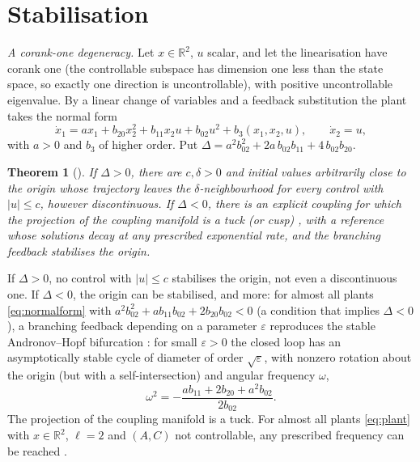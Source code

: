 \documentclass[11pt,reqno]{amsart}
\theoremstyle{plain}
\newtheorem*{theorem}{Theorem}
\theoremstyle{remark}
\theoremstyle{definition}
\newcommand{\R}{\mathbb{R}}
\begin{document}
\section{Stabilisation}\label{sec:stab}

\emph{A corank-one degeneracy.} Let $x\in\R^{2}$, $u$ scalar, and let the linearisation have corank one (the controllable subspace has dimension one less than the state space, so exactly one direction is uncontrollable), with positive uncontrollable eigenvalue. By a
linear change of variables and a feedback substitution the plant takes the normal form \cite[\S4.2]{Shosh1990}
\begin{equation}\label{eq:normalform}
  \dot x_1 = a x_1 + b_{20}x_2^{2} + b_{11}x_2u + b_{02}u^{2} + b_3(x_1,x_2,u),\qquad \dot x_2 = u,
\end{equation}
with $a>0$ and $b_3$ of higher order. Put $\Delta=a^{2}b_{02}^{2}+2a\,b_{02}b_{11}+4\,b_{02}b_{20}$.

\begin{theorem}[{\cite[Thm.~4.2, Prop.~4.4]{Shosh1990}}]
If $\Delta>0$, there are $c,\delta>0$ and initial values arbitrarily close to the origin whose trajectory leaves the
$\delta$-neighbourhood for every control with $|u|\le c$, however discontinuous. If $\Delta<0$, there is an
explicit coupling for which the projection of the coupling manifold is a tuck (or cusp) \cite{AGV,MondNuno2020}, with a reference whose solutions decay at any prescribed exponential rate, and the branching feedback stabilises the origin.
\end{theorem}

If $\Delta>0$, no control with $|u|\le c$ stabilises the origin, not even a discontinuous one. If $\Delta<0$, the origin can be
stabilised, and more: for almost all plants \eqref{eq:normalform} with
$a^{2}b_{02}^{2}+ab_{11}b_{02}+2b_{20}b_{02}<0$ (a condition that implies $\Delta<0$), a branching feedback depending on a
parameter $\varepsilon$ reproduces the stable Andronov--Hopf bifurcation \cite[Thms.~4.5, 4.6]{Shosh1990}: for small $\varepsilon>0$ the closed loop has an asymptotically stable cycle of
diameter of order $\sqrt\varepsilon$, with nonzero rotation about the origin (but with a self-intersection) and angular frequency $\omega$,
\[
  \omega^{2}=-\frac{ab_{11}+2b_{20}+a^{2}b_{02}}{2b_{02}} .
\]
The projection of the coupling manifold is a tuck. For almost all plants \eqref{eq:plant} with $x\in\R^{2}$, $\ell=2$
and $(A,C)$ not controllable, any prescribed frequency can be reached \cite[Rem.~4.7]{Shosh1990}.
\end{document}
